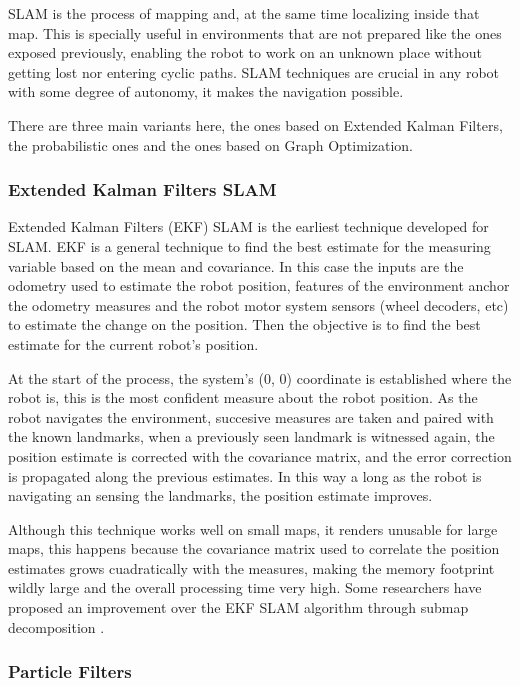     SLAM is the process of mapping and, at the same time localizing inside that map. This is specially useful in environments that are not prepared like the ones exposed previously, enabling the robot to work on an unknown place without getting lost nor entering cyclic paths. SLAM techniques are crucial in any robot with some degree of autonomy, it makes the navigation possible. 

    There are three main variants here, the ones based on Extended Kalman Filters, the probabilistic ones and the ones based on Graph Optimization.

    \subsubsection{Extended Kalman Filters SLAM}

      Extended Kalman Filters (EKF) SLAM is the earliest technique developed for SLAM. EKF is a general technique to find the best estimate for the measuring variable based on the mean and covariance. In this case the inputs are the odometry used to estimate the robot position, features of the environment anchor the odometry measures and the robot motor system sensors (wheel decoders, etc) to estimate the change on the position. Then the objective is to find the best estimate for the current robot's position.

      At the start of the process, the system's ($0$, $0$) coordinate is established where the robot is, this is the most confident measure about the robot position. As the robot navigates the environment, succesive measures are taken and paired with the known landmarks, when a previously seen landmark is witnessed again, the position estimate is corrected with the covariance matrix, and the error correction is propagated along the previous estimates. In this way a long as the robot is navigating an sensing the landmarks, the position estimate improves.

      Although this technique works well on small maps, it renders unusable for large maps, this happens because the covariance matrix used to correlate the position estimates grows cuadratically with the measures, making the memory footprint wildly large and the overall processing time very high. Some researchers have proposed an improvement over the EKF SLAM algorithm through submap decomposition \cite{Guivant2001, Leonard2000}.

    \subsubsection{Particle Filters}

